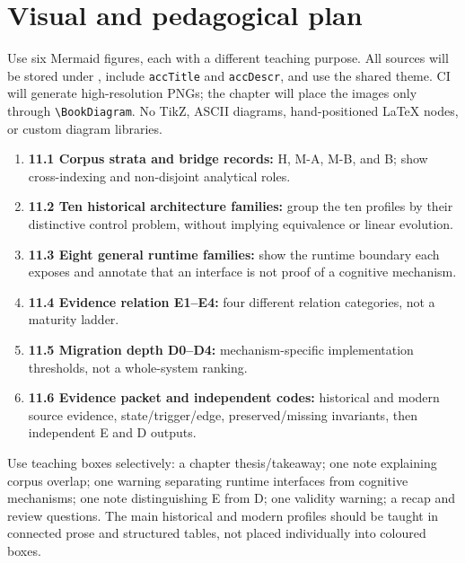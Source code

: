 \section{Visual and pedagogical plan}
Use six Mermaid figures, each with a different teaching purpose. All sources will be stored under , include \texttt{accTitle} and \texttt{accDescr}, and use the shared theme. CI will generate high-resolution PNGs; the chapter will place the images only through \texttt{\textbackslash BookDiagram}. No TikZ, ASCII diagrams, hand-positioned LaTeX nodes, or custom diagram libraries.
\begin{enumerate}
  \item \textbf{11.1 Corpus strata and bridge records:} H, M-A, M-B, and B; show cross-indexing and non-disjoint analytical roles.
  \item \textbf{11.2 Ten historical architecture families:} group the ten profiles by their distinctive control problem, without implying equivalence or linear evolution.
  \item \textbf{11.3 Eight general runtime families:} show the runtime boundary each exposes and annotate that an interface is not proof of a cognitive mechanism.
  \item \textbf{11.4 Evidence relation E1--E4:} four different relation categories, not a maturity ladder.
  \item \textbf{11.5 Migration depth D0--D4:} mechanism-specific implementation thresholds, not a whole-system ranking.
  \item \textbf{11.6 Evidence packet and independent codes:} historical and modern source evidence, state/trigger/edge, preserved/missing invariants, then independent E and D outputs.
\end{enumerate}

Use teaching boxes selectively: a chapter thesis/takeaway; one note explaining corpus overlap; one warning separating runtime interfaces from cognitive mechanisms; one note distinguishing E from D; one validity warning; a recap and review questions. The main historical and modern profiles should be taught in connected prose and structured tables, not placed individually into coloured boxes.

